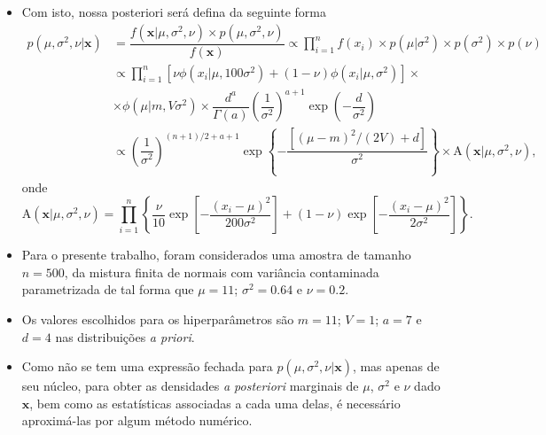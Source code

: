 \documentclass[9pt]{beamer}
\begin{document}
\begin{frame}
\begin{itemize}
\justifying	
\item Com isto, nossa posteriori será defina da seguinte forma
\begin{align} 
p(\mu, \sigma^2, \nu | \mathbf{x})
&= \dfrac{f(\mathbf{x} | \mu, \sigma^2, \nu) \times p(\mu, \sigma^2, \nu)}{f(\mathbf{x})} \propto \prod_{i=1}^{n} f(x_i) \times p(\mu | \sigma^2) \times p(\sigma^2) \times p(\nu) \nonumber\\
&\propto \prod_{i=1}^{n} \left[ \nu \phi(x_i | \mu, 100 \sigma^2) + (1 - \nu) \phi(x_i | \mu, \sigma^2) \right] \times \nonumber \\
&\times \phi(\mu | m, V \sigma^2) \times \dfrac{d^a}{\Gamma(a)} \left(\dfrac{1}{\sigma^2}\right)^{a + 1} \exp\left(-\dfrac{d}{\sigma^2}\right) \nonumber \\	&\propto \left(\dfrac{1}{\sigma^2}\right)^{(n + 1)/2 + a + 1} \exp\left\{-\dfrac{\left[(\mu - m)^2 / (2V) + d\right]}{\sigma^2}\right\} \times \textrm{A}(\mathbf{x} | \mu, \sigma^2, \nu), \label{eq:dist_post}
\end{align}
onde
\begin{equation*}
\textrm{A}(\mathbf{x} | \mu, \sigma^2, \nu) = \prod_{i=1}^{n} \left\{  \dfrac{\nu}{10} \exp\left[-\dfrac{(x_i - \mu)^2}{200\sigma^2}\right] + (1 - \nu) \exp\left[-\dfrac{(x_i - \mu)^2}{2\sigma^2}\right] \right\}.
\end{equation*}
\end{itemize}
\end{frame}
\begin{frame}
\begin{itemize}
	\justifying	
	\item Para o presente trabalho, foram considerados uma amostra de tamanho $n=500$, da mistura finita de normais com variância contaminada parametrizada de tal forma que $\mu = 11$; $\sigma^2 = 0.64$ e $\nu = 0.2$.
	\item Os valores escolhidos para os hiperparâmetros são $m = 11$; $V = 1$; $a = 7$ e $d = 4$ nas distribuições \textit{a priori}.
	\item Como não se tem uma expressão fechada para $p(\mu, \sigma^2, \nu | \mathbf{x})$, mas apenas de seu núcleo, para obter as densidades \textit{a posteriori} marginais de $\mu$, $\sigma^2$ e $\nu$ dado $\mathbf{x}$, bem como as estatísticas associadas a cada uma delas, é necessário aproximá-las por algum método numérico.
\end{itemize}
\end{frame}
\end{document}
